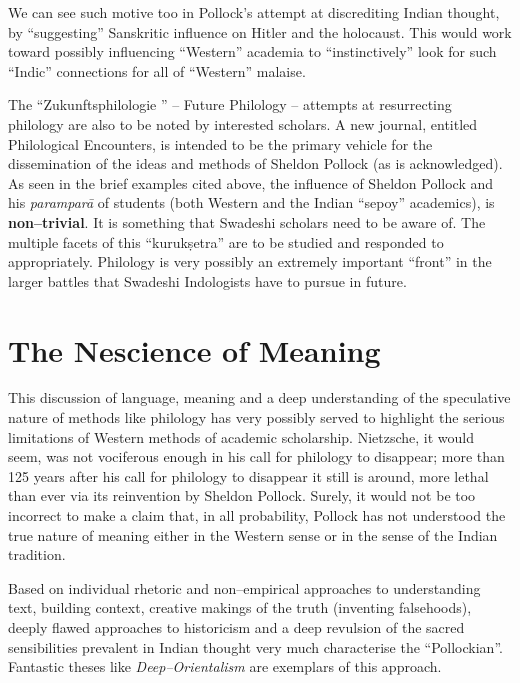 We can see such motive too in Pollock’s attempt at discrediting Indian thought, by “suggesting” Sanskritic influence on Hitler and the holocaust. This would work toward possibly influencing “Western” academia to “instinctively” look for such “Indic” connections for all of “Western” malaise. 

The “Zukunftsphilologie ” – Future Philology – attempts at resurrecting philology are also to be noted by interested scholars. A new journal, entitled Philological Encounters, is intended to be the primary vehicle for the dissemination of the ideas and methods of Sheldon Pollock (as is acknowledged). As seen in the brief examples cited above, the influence of Sheldon Pollock and his \textit{paramparā} of students (both Western and the Indian “sepoy” academics), is \textbf{non–trivial}. It is something that Swadeshi scholars need to be aware of. The multiple facets of this “kurukṣetra” are to be studied and responded to appropriately. Philology is very possibly an extremely important “front” in the larger battles that Swadeshi Indologists have to pursue in future.

\vskip -6pt


\section*{The Nescience of Meaning}

\vskip -6pt

This discussion of language, meaning and a deep understanding of the speculative nature of methods like philology has very possibly served to highlight the serious limitations of Western methods of academic scholarship. Nietzsche, it would seem, was not vociferous enough in his call for philology to disappear; more than 125 years after his call for philology to disappear it still is around, more lethal than ever via its reinvention by Sheldon Pollock. Surely, it would not be too incorrect to make a claim that, in all probability, Pollock has not understood the true nature of meaning either in the Western sense or in the sense of the Indian tradition.

Based on individual rhetoric and non–empirical approaches to understanding text, building context, creative makings of the truth (inventing falsehoods), deeply flawed approaches to historicism and a deep revulsion of the sacred sensibilities prevalent in Indian thought very much characterise the “Pollockian”. Fantastic theses like \textit{Deep–Orientalism} are exemplars of this approach.

